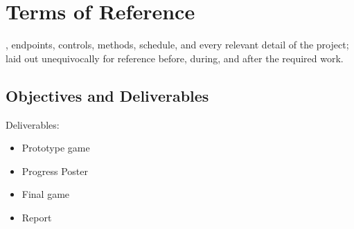 \chapter[Terms of Reference]{Terms of Reference}
\label{ch:reference}


, endpoints, controls, methods, schedule, and every relevant detail of the project; laid out unequivocally for reference before, during, and after the required work.

\section{Objectives and Deliverables}

Deliverables:

\begin{itemize}
	\item Prototype game
	\item Progress Poster
	\item Final game
	\item Report
\end{itemize}









